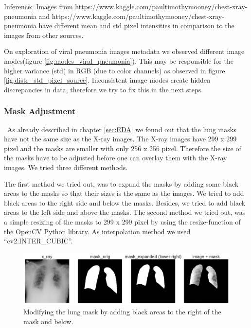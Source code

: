 \documentclass{article}
\begin{document}
\newpage
\underline{Inference:}\
Images from https://www.kaggle.com/paultimothymooney/chest-xray-pneumonia and
https://www.kaggle.com/paultimothymooney/chest-xray-pneumonia have different mean and std pixel intensities in comparison to the images from other sources.

On exploration of viral pneumonia images metadata we observed different image modes(figure \ref{fig:modes_viral_pneumonia}). This may be responsible for the higher variance (std) in RGB (due to color channels) as observed in figure \ref{fig:distr_std_pixel_source}. Inconsistent image modes create hidden discrepancies in data, therefore we try to fix this in the next steps.

\vspace{0.3cm}

\subsubsection{Mask Adjustment}\
As already described in chapter \ref{sec:EDA} we found out that the lung masks have not the same size as the X-ray images. The X-ray images have 299 x 299 pixel and the masks are smaller with only 256 x 256 pixel. Therefore the size of the masks have to be adjusted before one can overlay them with the X-ray images. We tried three different methods. 

The first method we tried out, was to expand the masks by adding some black areas to the masks so that their sizes is the same as the images. We tried to add black areas to the right side and below the masks. Besides, we tried to add black areas to the left side and above the masks. 
The second method we tried out, was a simple resizing of the masks to 299 x 299 pixel by using the resize-function of the OpenCV Python library. As interpolation method we used  “cv2.INTER\_CUBIC”.


\vspace{0.3cm}

\begin{figure}[h!]%
    \centering
    \includegraphics[width=1\linewidth]{lung_mask_report_lr.png}
    \caption{Modifying the lung mask by adding black areas to the right of the mask and below.}
    \label{fig:lung_mask_lr}
\end{figure}   
\end{document}
